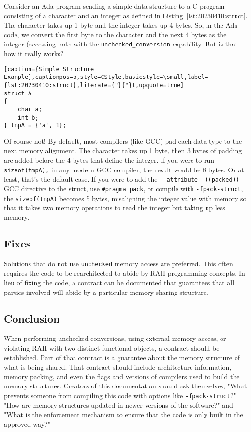 Consider an Ada program sending a simple data structure to a C program consisting of a character and an integer as defined in Listing~\ref{lst:20230410:struct}. The character takes up 1 byte and the integer takes up 4 bytes. So, in the Ada code, we convert the first byte to the character and the next 4 bytes as the integer (accessing both with the \texttt{unchecked\_conversion} capability. But is that how it really works?
\begin{lstlisting}[caption={Simple Structure Example},captionpos=b,style=CStyle,basicstyle=\small,label={lst:20230410:struct},literate={"}{"}1,upquote=true]
struct A
{
	char a;
	int b;
} tmpA = {'a', 1};
\end{lstlisting}

Of course not! By default, most compilers (like GCC) pad each data type to the next memory alignment. The character takes up 1 byte, then 3 bytes of padding are added before the 4 bytes that define the integer. If you were to run \texttt{sizeof(tmpA);} in any modern GCC compiler, the result would be 8 bytes. Or at least, that's the default case. If you were to add the \texttt{\_\_attribute\_\_((packed))} GCC directive to the struct, use \texttt{\#pragma pack}, or compile with \texttt{-fpack-struct}, the \texttt{sizeof(tmpA)} becomes 5 bytes, misaligning the integer value with memory so that it takes two memory operations to read the integer but taking up less memory.

\subsection{Fixes}
Solutions that do not use \texttt{unchecked} memory access are preferred. This often requires the code to be rearchitected to abide by RAII programming concepts. In lieu of fixing the code, a contract can be documented that guarantees that all parties involved will abide by a particular memory sharing structure.

\subsection{Conclusion}
When performing unchecked conversions, using external memory access, or violating RAII with two distinct functional objects, a contract should be established. Part of that contract is a guarantee about the memory structure of what is being shared. That contract should include architecture information, memory packing, and even the flags and versions of compilers used to build the memory structures. Creators of this documentation should ask themselves, "What prevents someone from compiling this code with options like \texttt{-fpack-struct}?" "How are memory structures updated in newer versions of the software?" and "What is the enforcement mechanism to ensure that the code is only built in the approved way?"

